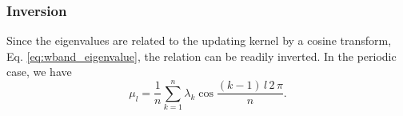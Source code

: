 \documentclass[reprint, floatfix]{revtex4-1}
\begin{document}



\subsubsection{\label{sec:invert_wband}
Inversion}



Since the eigenvalues are related to the updating kernel
by a cosine transform,
Eq. \eqref{eq:wband_eigenvalue},
the relation can be readily inverted.
%
In the periodic case,
we have
%
\begin{equation}
  \mu_l
  =
  \frac 1 n
  \sum_{ k = 1 }^n
  \lambda_k
  \cos \frac{ (k - 1) \, l \, 2 \, \pi }
            {            n             }
  .
\label{eq:mu_from_lambda_pbc}
\end{equation}
\end{document}
